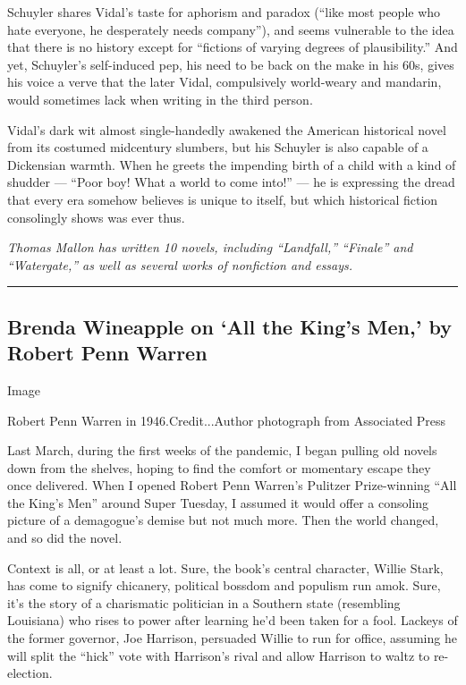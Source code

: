 Schuyler shares Vidal's taste for aphorism and paradox (``like most
people who hate everyone, he desperately needs company''), and seems
vulnerable to the idea that there is no history except for ``fictions of
varying degrees of plausibility.'' And yet, Schuyler's self-induced pep,
his need to be back on the make in his 60s, gives his voice a verve that
the later Vidal, compulsively world-weary and mandarin, would sometimes
lack when writing in the third person.

Vidal's dark wit almost single-handedly awakened the American historical
novel from its costumed midcentury slumbers, but his Schuyler is also
capable of a Dickensian warmth. When he greets the impending birth of a
child with a kind of shudder --- ``Poor boy! What a world to come
into!'' --- he is expressing the dread that every era somehow believes
is unique to itself, but which historical fiction consolingly shows was
ever thus.

\emph{Thomas Mallon has written 10 novels, including ``Landfall,''
``Finale'' and ``Watergate,'' as well as several works of nonfiction and
essays.}

\begin{center}\rule{0.5\linewidth}{\linethickness}\end{center}

\hypertarget{brenda-wineapple-on-all-the-kings-men-by-robert-penn-warren}{%
\subsection{Brenda Wineapple on `All the King's Men,' by Robert Penn
Warren}\label{brenda-wineapple-on-all-the-kings-men-by-robert-penn-warren}}

Image

Robert Penn Warren in 1946.Credit...Author photograph from Associated
Press

Last March, during the first weeks of the pandemic, I began pulling old
novels down from the shelves, hoping to find the comfort or momentary
escape they once delivered. When I opened Robert Penn Warren's Pulitzer
Prize-winning ``All the King's Men'' around Super Tuesday, I assumed it
would offer a consoling picture of a demagogue's demise but not much
more. Then the world changed, and so did the novel.

Context is all, or at least a lot. Sure, the book's central character,
Willie Stark, has come to signify chicanery, political bossdom and
populism run amok. Sure, it's the story of a charismatic politician in a
Southern state (resembling Louisiana) who rises to power after learning
he'd been taken for a fool. Lackeys of the former governor, Joe
Harrison, persuaded Willie to run for office, assuming he will split the
``hick'' vote with Harrison's rival and allow Harrison to waltz to
re-election.

